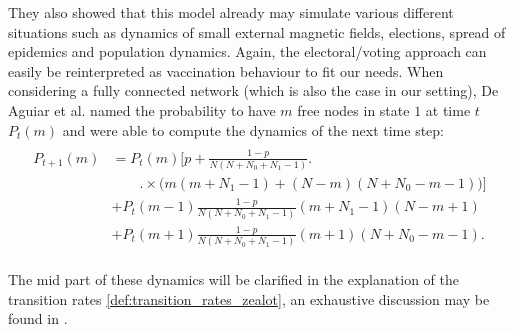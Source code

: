 \documentclass[12pt,a4paper,twoside]{article}
\begin{document}
They also showed that this model already may simulate various different situations such as dynamics of small external magnetic fields, elections, spread of epidemics and population dynamics. Again, the electoral/voting approach can easily be reinterpreted as vaccination behaviour to fit our needs. When considering a fully connected network (which is also the case in our setting), De Aguiar et al. named the probability to have $m$ free nodes in state $1$ at time $t$ $P_t\left(m\right)$ and were able to compute the dynamics of the next time step:
\begin{align}\label{eq:chinellato_dynamics}
	\begin{split}
	\begin{aligned}
		P_{t+1}\left(m\right) &= P_t\left(m\right)\Big[p +\frac{1-p}{N\left(N+N_0+N_1-1\right)}\Big.\\
		&\qquad \Big.\times\big(m\left(m+N_1-1\right) +\left(N-m\right)\left(N+N_0-m-1\right)\big)\Big]\\
		&+P_t\left(m-1\right)\frac{1-p}{N\left(N+N_0+N_1-1\right)}\left(m+N_1-1\right)\left(N-m+1\right)\\
		&+P_t\left(m+1\right)\frac{1-p}{N\left(N+N_0+N_1-1\right)}\left(m+1\right)\left(N+N_0-m-1\right).
	\end{aligned}
	\end{split}
\end{align}

The mid part of these dynamics will be clarified in the explanation of the transition rates \eqref{def:transition_rates_zealot}, an exhaustive discussion may be found in \cite{Aguiar2011, Chinellato2015}. 
\end{document}
